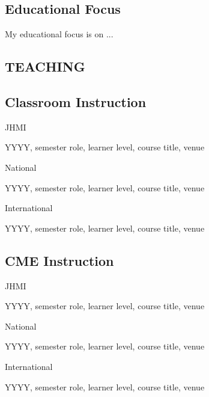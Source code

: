 \documentclass[11pt]{article}
\newenvironment{lyxlist}[1]
	{\begin{list}{}
		{\setlength\itemsep{-0.5ex}
		\settowidth{\labelwidth}{#1}
		 \setlength{\leftmargin}{\labelwidth}
		 \addtolength{\leftmargin}{\labelsep}
		 \renewcommand{\makelabel}[1]{##1\hfil}}}
	{\end{list}}
\newcommand{\mylift}[1]{\vspace*{#1}}
\begin{document}
\subsection*{Educational Focus}
\mylift{-.5em}
My educational focus is on ...  

\subsection*{TEACHING}

\subsection*{Classroom Instruction}
\begin{lyxlist}{2020 (Winter, virtual)}

\item[{\textcolor{color1}{JHMI}}]

\item[{YYYY, semester}]role, learner level, course title, venue

\item[{\textcolor{color1}{National}}]

\item[{YYYY, semester}]role, learner level, course title, venue

\item[{\textcolor{color1}{International}}]
\item[{YYYY, semester}]role, learner level, course title, venue

\end{lyxlist}

\subsection*{CME Instruction}
\begin{lyxlist}{2020 (Winter, virtual)}

\item[{\textcolor{color1}{JHMI}}]

\item[{YYYY, semester}]role, learner level, course title, venue

\item[{\textcolor{color1}{National}}]

\item[{YYYY, semester}]role, learner level, course title, venue

\item[{\textcolor{color1}{International}}]
\item[{YYYY, semester}]role, learner level, course title, venue

\end{lyxlist}
\end{document}
